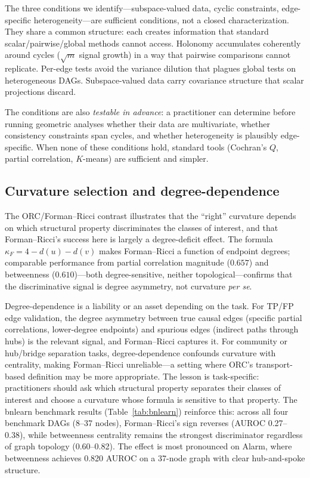 \documentclass{article}
\begin{document}
The three conditions we identify---subspace-valued data, cyclic constraints, edge-specific heterogeneity---are sufficient conditions, not a closed characterization.
They share a common structure: each creates information that standard scalar/pairwise/global methods cannot access.
Holonomy accumulates coherently around cycles ($\sqrt{m}$ signal growth) in a way that pairwise comparisons cannot replicate.
Per-edge tests avoid the variance dilution that plagues global tests on heterogeneous DAGs.
Subspace-valued data carry covariance structure that scalar projections discard.

The conditions are also \emph{testable in advance}: a practitioner can determine before running geometric analyses whether their data are multivariate, whether consistency constraints span cycles, and whether heterogeneity is plausibly edge-specific.
When none of these conditions hold, standard tools (Cochran's $Q$, partial correlation, $K$-means) are sufficient and simpler.

\subsection{Curvature selection and degree-dependence}

The ORC/Forman--Ricci contrast illustrates that the ``right'' curvature depends on which structural property discriminates the classes of interest, and that Forman--Ricci's success here is largely a degree-deficit effect.
The formula $\kappa_F = 4 - d(u) - d(v)$ makes Forman--Ricci a function of endpoint degrees; comparable performance from partial correlation magnitude ($0.657$) and betweenness ($0.610$)---both degree-sensitive, neither topological---confirms that the discriminative signal is degree asymmetry, not curvature \emph{per se}.

Degree-dependence is a liability or an asset depending on the task.
For TP/FP edge validation, the degree asymmetry between true causal edges (specific partial correlations, lower-degree endpoints) and spurious edges (indirect paths through hubs) is the relevant signal, and Forman--Ricci captures it.
For community or hub/bridge separation tasks, degree-dependence confounds curvature with centrality, making Forman--Ricci unreliable---a setting where ORC's transport-based definition may be more appropriate.
The lesson is task-specific: practitioners should ask which structural property separates their classes of interest and choose a curvature whose formula is sensitive to that property.
The bnlearn benchmark results (Table~\ref{tab:bnlearn}) reinforce this: across all four benchmark DAGs (8--37 nodes), Forman--Ricci's sign reverses (AUROC 0.27--0.38), while betweenness centrality remains the strongest discriminator regardless of graph topology (0.60--0.82). The effect is most pronounced on Alarm, where betweenness achieves 0.820 AUROC on a 37-node graph with clear hub-and-spoke structure.
\end{document}
